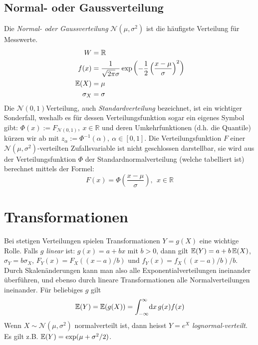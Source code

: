 \subsection{Normal- oder Gaussverteilung}
Die \emph{Normal- oder Gaussverteilung} $\mathcal{N}(\mu,\sigma^2)$ ist die häufigste Verteilung für Messwerte.
\begin{align*}
	W&=\mathbb{R}\\
	f(x)&=\frac{1}{\sqrt{2\pi}\sigma} \exp\left(-\frac{1}{2}\left(\frac{x-\mu}{\sigma}\right)^2\right)\\
	\operatorname{\mathbb E}(X)&=\mu\\
	\sigma_X&=\sigma
\end{align*}
Die $\mathcal{N}(0,1)$Verteilung, auch \emph{Standardverteilung} bezeichnet, ist ein wichtiger Sonderfall, weshalb es für dessen Verteilungsfunktion sogar ein eigenes Symbol gibt: $\Phi(x) := F_{\mathcal{N}(0,1)}, \ x\in\mathbb{R}$ und deren Umkehrfunktionen (d.h. die Quantile) kürzen wir ab mit $z_\alpha := \Phi^{-1}(\alpha), \ \alpha \in [0,1]$. Die Verteilungsfunktion $F$ einer $\mathcal{N}(\mu,\sigma^2)$-verteilten Zufallsvariable ist nicht geschlossen darstellbar, sie wird aus der Verteilungsfunktion $\Phi$ der Standardnormalverteilung (welche tabelliert ist) berechnet mittels der Formel:
\begin{equation}
	F(x)=\Phi\left(\frac{x-\mu}{\sigma}\right), \ \ x \in \mathbb{R}
\end{equation}
%
\section{Transformationen}
Bei stetigen Verteilungen spielen Transformationen $Y=g(X)$ eine wichtige Rolle. Falls $g$ \emph{linear} ist: $g(x)=a+bx$ mit $b>0$, dann gilt $\operatorname{\mathbb E}(Y)=a+b\operatorname{\mathbb E}(X)$, $\sigma_Y=b\sigma_X$, $F_Y(x)=F_X((x-a)/b)$ und $f_Y(x)=f_X((x-a)/b)/b$. Durch Skalenänderungen kann man also alle Exponentialverteilungen ineinander überführen, und ebenso durch lineare Transformationen alle Normalverteilungen ineinander. Für beliebiges $g$ gilt
\begin{equation}
	\operatorname{\mathbb E}(Y)=\operatorname{\mathbb E}(g(X))=\int_{-\infty}^\infty\!\mathrm d x\, g(x)f(x)
\end{equation}
Wenn $X\sim \mathcal{N}(\mu,\sigma^2)$ normalverteilt ist, dann heisst $Y=e^X$ \emph{lognormal-verteilt}. Es gilt z.B. $\operatorname{\mathbb E}(Y)=\exp(\mu+\sigma^2/2)$.
%
